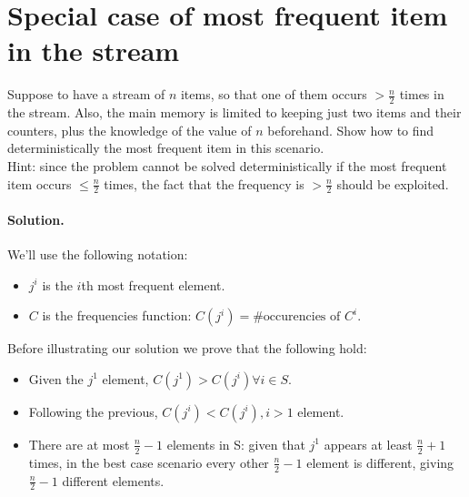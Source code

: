 \section{Special case of most frequent item in the stream}

Suppose to have a stream of $n$ items, so that one of them occurs $> \frac{n}{2}$
times in the stream.
Also, the main memory is limited to keeping just two items and their counters, plus
the knowledge of the value of $n$ beforehand.
Show how to find deterministically the most frequent item in this scenario.
\\ Hint: since the problem cannot be solved deterministically if the most
frequent item occurs $\leq \frac{n}{2}$ times, the fact that the frequency is
$> \frac{n}{2}$ should be exploited.

\vspace{0.5cm}
\paragraph{Solution.}
We'll use the following notation:
\begin{itemize}
  \item $j^i$ is the $i$th most frequent element.
  \item $C$ is the frequencies function: $C(j^i) = \#\text{occurencies of } C^i$. 
\end{itemize}
Before illustrating our solution we prove that the following hold:
    \begin{itemize}
    \label{frequence_dominance}\item Given the $j^{1}$ element, $C(j^{1}) > C(j^{i}) \forall i \in S$.
    \item Following the previous, $C(j^{i}) < C(j^{i}),  i > 1$ element.
    \item There are at most $\frac{n}{2} - 1$ elements in S: given that $j^{1}$ appears at least $\frac{n}{2} + 1$ times, in the best case scenario every other $\frac{n}{2} - 1$ element is different, giving $\frac{n}{2} - 1$ different elements.
    \end{itemize}

